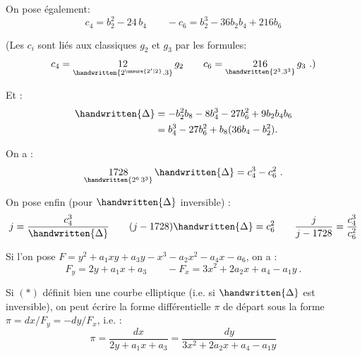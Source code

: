 
On pose également:
\[
 c_{4}=b_{2}^{2}-24\,b_{4}\qquad -c_{6}=b_{2}^{3}-36b_{2}b_{4}+216b_{6}
\]

(Les $c_{i}$ sont liés aux classiques $g_{2}$ et $g_{3}$ par les formules:
\[
 c_{4}=\underset{\handwritten{2^{\unsure{2'|2}}\mathord{.}3}}{12}\,g_{2}
 \qquad c_{6}=\underset{\handwritten{2^{3}\mathord{.}3^{3}}}{216}\,g_{3}\ .)
\]

Et :
\[
\begin{aligned}
\handwritten{\Delta}&=-b_{2}^{2}b_{8}-8b_{4}^{3}-27b_{6}^{2}+9b_{2}b_{4}b_{6}\\
&=b_{4}^{3}-27b_{6}^{2}+b_{8}(36b_{4}-b_{2}^{2}).
\end{aligned}
\]

On a :
\[
 \underset{\handwritten{2^{6}\,3^{3}}}{1728}\,\handwritten{\Delta}=c_{4}^{3}-c_{6}^{2}\ .
\]

On pose enfin (pour $\handwritten{\Delta}$ inversible) :
\[
 j=\frac{c_{4}^{3}}{\handwritten{\Delta}}\qquad
 (j-1728)\handwritten{\Delta}=c_{6}^{2}\qquad
 \frac{j}{j-1728}=\frac{c_{4}^{3}}{c_{6}^{2}}
\]

Si l'on pose $F=y^{2}+a_{1}xy+a_{3}y-x^{3}-a_{2}x^{2}-a_{4}x-a_{6}$, on a :
\[
 F_{y}=2y+a_{1}x+a_{3}\qquad -F_{x}=3x^{2}+2a_{2}x+a_{4}-a_{1}y\ .
\]

Si $(\ast)$ définit bien une courbe elliptique (i.e. si $\handwritten{\Delta}$ est inversible), on peut écrire la forme différentielle $\pi$ de départ sous la forme $\pi=dx/F_{y}=-dy/F_{x}$, i.e. :
\[
 \pi=\frac{dx}{2y+a_{1}x+a_{3}}=\frac{dy}{3x^{2}+2a_{2}x+a_{4}-a_{1}y}
\]
